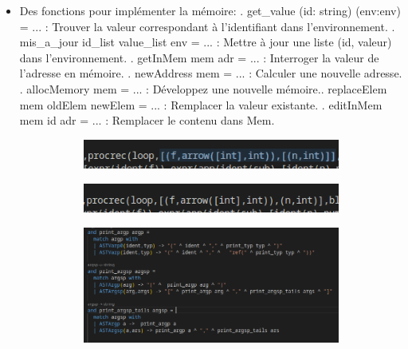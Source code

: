 \documentclass{article}
\begin{document}
\begin{itemize}
		\item Des fonctions pour implémenter la mémoire: . get\_value (id: string) (env:env) = ... : Trouver la valeur correspondant à l'identifiant dans l'environnement. . mis\_a\_jour id\_list value\_list env = ... : Mettre à jour une liste (id, valeur) dans l'environnement. . getInMem mem adr = ... : Interroger la valeur de l'adresse en mémoire. . newAddress mem = ... : Calculer une nouvelle adresse. . allocMemory mem = ... : Développez une nouvelle mémoire.. replaceElem mem oldElem newElem = ... : Remplacer la valeur existante. . editInMem mem id adr = ... : Remplacer le contenu dans Mem.

			\begin{figure}[H]
			\centering
			\begin{subfigure}{0.45\textwidth}
				\centering
				\includegraphics[width=\textwidth]{./images/error.png} 
				\label{fig:sub1}
			\end{subfigure}
			\hfill
			\begin{subfigure}{0.45\textwidth}
				\centering
				\includegraphics[width=\textwidth]{./images/error_correction.png} 
				\label{fig:sub2}
			\end{subfigure}
			\hfill
			\begin{subfigure}{0.8\textwidth}
				\centering
				\includegraphics[width=\textwidth]{./images/error_solution.png} 
				\label{fig:sub2}
			\end{subfigure}
			\label{fig:images}
		\end{figure}
		

\end{itemize}
\end{document}
